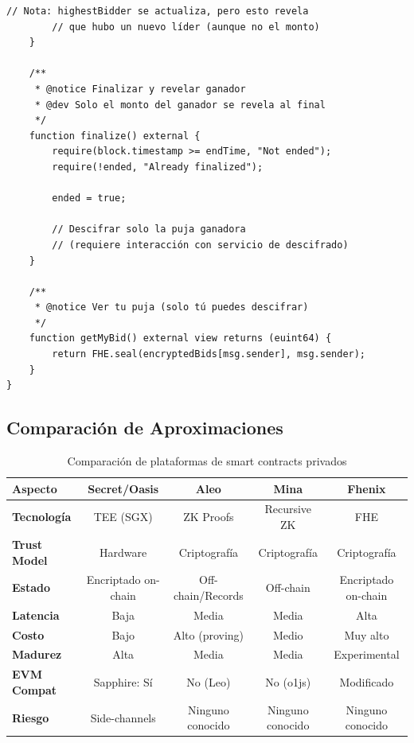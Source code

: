 \documentclass[11pt,a4paper,twoside]{book}
\theoremstyle{definition}
\theoremstyle{remark}
\begin{document}
\begin{lstlisting}[language=Solidity, caption={Conceptual: Smart contract con FHE (estilo Fhenix)}]
        // Nota: highestBidder se actualiza, pero esto revela
        // que hubo un nuevo líder (aunque no el monto)
    }
    
    /**
     * @notice Finalizar y revelar ganador
     * @dev Solo el monto del ganador se revela al final
     */
    function finalize() external {
        require(block.timestamp >= endTime, "Not ended");
        require(!ended, "Already finalized");
        
        ended = true;
        
        // Descifrar solo la puja ganadora
        // (requiere interacción con servicio de descifrado)
    }
    
    /**
     * @notice Ver tu puja (solo tú puedes descifrar)
     */
    function getMyBid() external view returns (euint64) {
        return FHE.seal(encryptedBids[msg.sender], msg.sender);
    }
}
\end{lstlisting}

\subsection{Comparación de Aproximaciones}

\begin{table}[htbp]
\centering
\footnotesize
\begin{tabular}{lcccc}
\toprule
\textbf{Aspecto} & \textbf{Secret/Oasis} & \textbf{Aleo} & \textbf{Mina} & \textbf{Fhenix} \\
\midrule
\textbf{Tecnología} & TEE (SGX) & ZK Proofs & Recursive ZK & FHE \\
\textbf{Trust Model} & Hardware & Criptografía & Criptografía & Criptografía \\
\textbf{Estado} & Encriptado on-chain & Off-chain/Records & Off-chain & Encriptado on-chain \\
\textbf{Latencia} & Baja & Media & Media & Alta \\
\textbf{Costo} & Bajo & Alto (proving) & Medio & Muy alto \\
\textbf{Madurez} & Alta & Media & Media & Experimental \\
\textbf{EVM Compat} & Sapphire: Sí & No (Leo) & No (o1js) & Modificado \\
\textbf{Riesgo} & Side-channels & Ninguno conocido & Ninguno conocido & Ninguno conocido \\
\bottomrule
\end{tabular}
\caption{Comparación de plataformas de smart contracts privados}
\end{table}
\end{document}
